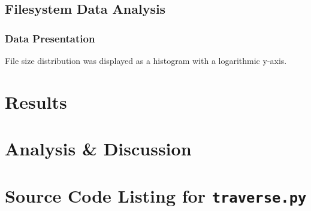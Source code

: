 \documentclass[12pt,a4paper]{article}
\begin{document}
		\subsection{Filesystem Data Analysis}
			\subsubsection{Data Presentation}

				File size distribution was displayed as a histogram with a logarithmic y-axis.
	\section{Results}
	\section{Analysis \& Discussion}
	\appendix
	\section{Source Code Listing for \texttt{traverse.py}}\label{ap:a}
		
\end{document}
